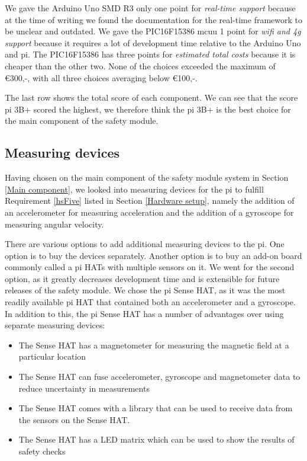 \documentclass[12pt]{scrreprt}
\begin{document}
We gave the Arduino Uno SMD R3 only one point for \textit{real-time support} because at the time of writing we found the documentation for the real-time framework to be unclear and outdated. We gave the PIC16F15386 \gls{mcuu} 1 point for \textit{\gls{wifi} and \gls{4g} support} because it requires a lot of development time relative to the Arduino Uno and \gls{pi}. The PIC16F15386 has three points for \textit{estimated total costs} because it is cheaper than the other two. None of the choices exceeded the maximum of €300,-, with all three choices averaging below €100,-.
\par
The last row shows the total score of each component. We can see that the score \gls{pi} 3B+ scored the highest, we therefore think the \gls{pi} 3B+ is the best choice for the main component of the safety module.

\subsection{Measuring devices}
Having chosen on the main component of the safety module system in Section \ref{Main component}, we looked into measuring devices for the \gls{pi} to fulfill Requirement \ref{hsFive} listed in Section \ref{Hardware setup}, namely the addition of an accelerometer for measuring acceleration and the addition of a gyroscope for measuring angular velocity.
\par
There are various options to add additional measuring devices to the \gls{pi}. One option is to buy the devices separately. Another option is to buy an add-on board commonly called a \gls{pi} HATs with multiple sensors on it. We went for the second option, as it greatly decreases development time and is extensible for future releases of the safety module. We chose the \gls{pi} Sense HAT, as it was the most readily available \gls{pi} HAT that contained both an accelerometer and a gyroscope. In addition to this, the \gls{pi} Sense HAT has a number of advantages over using separate measuring devices:

\begin{itemize}
    \item The Sense HAT has a magnetometer for measuring the magnetic field at a particular location
    \item The Sense HAT can fuse accelerometer, gyroscope and magnetometer data to reduce uncertainty in measurements
    \item The Sense HAT comes with a library that can be used to receive data from the sensors on the Sense HAT.
    \item The Sense HAT has a LED matrix which can be used to show the results of safety checks
\end{itemize}
\end{document}
